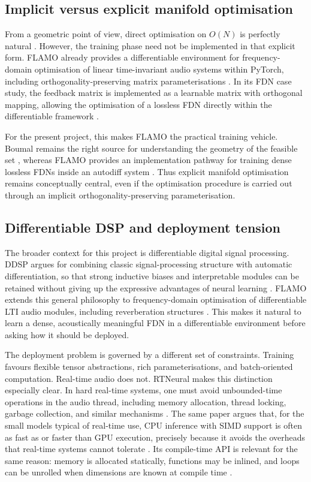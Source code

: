 \documentclass[12pt,a4paper]{article}
\begin{document}
\subsection{Implicit versus explicit manifold optimisation}

From a geometric point of view, direct optimisation on $O(N)$ is
perfectly natural \cite{boumal}. However, the training phase need
not be implemented in that explicit form. FLAMO already provides a
differentiable environment for frequency-domain optimisation of
linear time-invariant audio systems within PyTorch, including
orthogonality-preserving matrix parameterisations \cite{flamo}. In
its FDN case study, the feedback matrix is implemented as a learnable
matrix with orthogonal mapping, allowing the optimisation of a
lossless FDN directly within the differentiable framework
\cite{flamo}.

For the present project, this makes FLAMO the practical training
vehicle. Boumal remains the right source for understanding the
geometry of the feasible set \cite{boumal}, whereas FLAMO provides
an implementation pathway for training dense lossless FDNs inside an
autodiff system \cite{flamo}. Thus explicit manifold optimisation
remains conceptually central, even if the optimisation procedure is
carried out through an implicit orthogonality-preserving
parameterisation.

\subsection{Differentiable DSP and deployment tension}

The broader context for this project is differentiable digital signal
processing. DDSP argues for combining classic signal-processing
structure with automatic differentiation, so that strong inductive
biases and interpretable modules can be retained without giving up
the expressive advantages of neural learning
\cite{ddsp}. FLAMO extends this general philosophy to
frequency-domain optimisation of differentiable LTI audio modules,
including reverberation structures \cite{flamo}. This
makes it natural to learn a dense, acoustically meaningful FDN in a
differentiable environment before asking how it should be deployed.

The deployment problem is governed by a different set of
constraints. Training favours flexible tensor abstractions, rich
parameterisations, and batch-oriented computation. Real-time audio
does not. RTNeural makes this distinction especially clear. In hard
real-time systems, one must avoid unbounded-time operations in the
audio thread, including memory allocation, thread locking, garbage
collection, and similar mechanisms \cite{chowdhury}.
The same paper argues that, for the small models typical of
real-time use, CPU inference with SIMD support is often as fast
as or faster than GPU execution, precisely because it avoids the
overheads that real-time systems cannot tolerate
\cite{chowdhury}. Its compile-time API is relevant
for the same reason: memory is allocated statically, functions may
be inlined, and loops can be unrolled when dimensions are known
at compile time \cite{chowdhury}.
\end{document}
